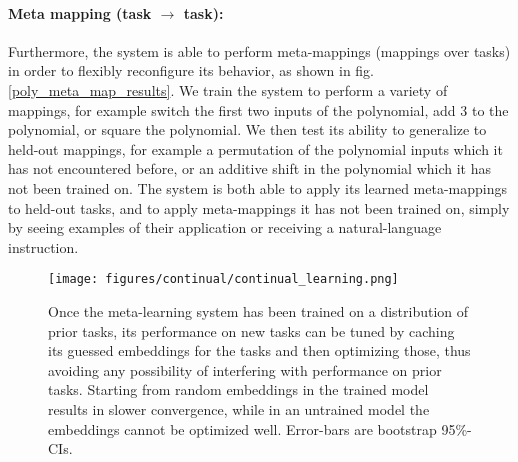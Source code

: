 \documentclass{article}
\begin{document}
\paragraph{Meta mapping (task $\rightarrow$ task):} Furthermore, the system is able to perform meta-mappings (mappings over tasks) in order to flexibly reconfigure its behavior, as shown in fig. \ref{poly_meta_map_results}. We train the system to perform a variety of mappings, for example switch the first two inputs of the polynomial, add 3 to the polynomial, or square the polynomial. We then test its ability to generalize to held-out mappings, for example a permutation of the polynomial inputs which it has not encountered before, or an additive shift in the polynomial which it has not been trained on. The system is both able to apply its learned meta-mappings to held-out tasks, and to apply meta-mappings it has not been trained on, simply by seeing examples of their application or receiving a natural-language instruction. \par 
\begin{figure}
\centering
\texttt{[image: figures/continual/continual\_learning.png]}
\caption{Once the meta-learning system has been trained on a distribution of prior tasks, its performance on new tasks can be tuned by caching its guessed embeddings for the tasks and then optimizing those, thus avoiding any possibility of interfering with performance on prior tasks. Starting from random embeddings in the trained model results in slower convergence, while in an untrained model the embeddings cannot be optimized well. Error-bars are bootstrap 95\%-CIs.}
\label{poly_continual_results}
\end{figure}
\vspace{-0.7em}
\end{document}
